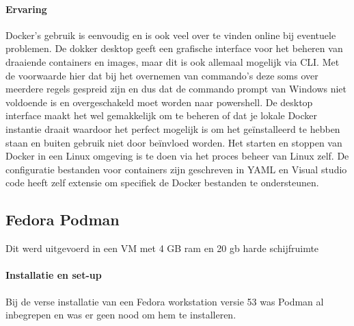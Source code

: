 \paragraph{Ervaring}
Docker’s gebruik is eenvoudig en is ook veel over te vinden online bij eventuele problemen.  De dokker desktop geeft een grafische interface voor het beheren van draaiende containers en images, maar dit is ook allemaal mogelijk via CLI. Met de voorwaarde hier dat bij het overnemen van commando’s deze soms over meerdere regels gespreid zijn en dus dat de commando prompt van Windows niet voldoende is en overgeschakeld moet worden naar powershell.  De desktop interface maakt het wel gemakkelijk om te beheren of dat je lokale Docker instantie draait waardoor het perfect mogelijk is om het geïnstalleerd te hebben staan en buiten gebruik niet door beïnvloed worden. Het starten en stoppen van Docker in een Linux omgeving is te doen via het proces beheer van Linux zelf.  De configuratie bestanden voor containers zijn geschreven in YAML en Visual studio code heeft zelf extensie om specifiek de Docker bestanden te ondersteunen.

\subsection{Fedora Podman}
Dit werd uitgevoerd in een VM met 4 GB ram en 20 gb harde schijfruimte
\paragraph{Installatie en set-up}
Bij de verse installatie van een Fedora workstation versie 53 was Podman al inbegrepen en was er geen nood om hem te installeren.

